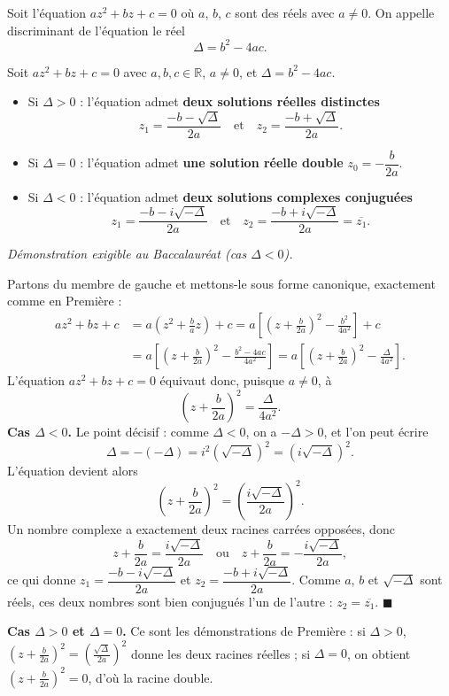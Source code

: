 \documentclass[11pt]{article}
\newcommand{\cle}[1]{{\popxbold\color{popdark}#1}}
\begin{document}
\begin{definition}[Discriminant]
Soit l'équation $az^2 + bz + c = 0$ où $a$, $b$, $c$ sont des \cle{réels} avec $a \neq 0$. On appelle \cle{discriminant} de l'équation le réel
\[ \Delta = b^2 - 4ac. \]
\end{definition}

\begin{propriete}[Théorème — Résolution de $az^2+bz+c=0$ à coefficients réels]
Soit $az^2 + bz + c = 0$ avec $a, b, c \in \mathbb{R}$, $a \neq 0$, et $\Delta = b^2 - 4ac$.
\begin{itemize}
\item Si $\Delta > 0$ : l'équation admet \textbf{deux solutions réelles distinctes}
\[ z_1 = \frac{-b - \sqrt{\Delta}}{2a} \quad \text{et} \quad z_2 = \frac{-b + \sqrt{\Delta}}{2a}. \]
\item Si $\Delta = 0$ : l'équation admet \textbf{une solution réelle double} $z_0 = -\dfrac{b}{2a}$.
\item Si $\Delta < 0$ : l'équation admet \textbf{deux solutions complexes conjuguées}
\[ z_1 = \frac{-b - i\sqrt{-\Delta}}{2a} \quad \text{et} \quad z_2 = \frac{-b + i\sqrt{-\Delta}}{2a} = \overline{z_1}. \]
\end{itemize}
\emph{Démonstration exigible au Baccalauréat (cas $\Delta < 0$).}
\end{propriete}

\begin{experience}
Partons du membre de gauche et mettons-le sous \cle{forme canonique}, exactement comme en Première :
\begin{align*}
az^2 + bz + c &= a\left(z^2 + \frac{b}{a}z\right) + c = a\left[\left(z + \frac{b}{2a}\right)^2 - \frac{b^2}{4a^2}\right] + c \\
&= a\left[\left(z + \frac{b}{2a}\right)^2 - \frac{b^2 - 4ac}{4a^2}\right] = a\left[\left(z + \frac{b}{2a}\right)^2 - \frac{\Delta}{4a^2}\right].
\end{align*}
L'équation $az^2 + bz + c = 0$ équivaut donc, puisque $a \neq 0$, à
\[ \left(z + \frac{b}{2a}\right)^2 = \frac{\Delta}{4a^2}. \]
\textbf{Cas $\Delta < 0$.} Le point décisif : comme $\Delta < 0$, on a $-\Delta > 0$, et l'on peut écrire
\[ \Delta = -(-\Delta) = i^2 \left(\sqrt{-\Delta}\right)^2 = \left(i\sqrt{-\Delta}\right)^2. \]
L'équation devient alors
\[ \left(z + \frac{b}{2a}\right)^2 = \left(\frac{i\sqrt{-\Delta}}{2a}\right)^2. \]
Un nombre complexe a exactement deux racines carrées opposées, donc
\[ z + \frac{b}{2a} = \frac{i\sqrt{-\Delta}}{2a} \quad \text{ou} \quad z + \frac{b}{2a} = -\frac{i\sqrt{-\Delta}}{2a}, \]
ce qui donne $z_1 = \dfrac{-b - i\sqrt{-\Delta}}{2a}$ et $z_2 = \dfrac{-b + i\sqrt{-\Delta}}{2a}$. Comme $a$, $b$ et $\sqrt{-\Delta}$ sont réels, ces deux nombres sont bien \cle{conjugués} l'un de l'autre : $z_2 = \overline{z_1}$. $\blacksquare$

\textbf{Cas $\Delta > 0$ et $\Delta = 0$.} Ce sont les démonstrations de Première : si $\Delta > 0$, $\left(z + \frac{b}{2a}\right)^2 = \left(\frac{\sqrt{\Delta}}{2a}\right)^2$ donne les deux racines réelles ; si $\Delta = 0$, on obtient $\left(z + \frac{b}{2a}\right)^2 = 0$, d'où la racine double.
\end{experience}
\end{document}
